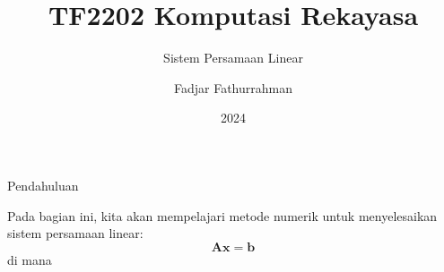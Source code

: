 

\title{TF2202 Komputasi Rekayasa}
\subtitle{Sistem Persamaan Linear}
\author{Fadjar Fathurrahman}
\date{2024}



\frame{\titlepage}

\begin{frame}{Pendahuluan}

Pada bagian ini, kita akan mempelajari metode numerik
untuk menyelesaikan sistem persamaan linear:
$$
\mathbf{A}\mathbf{x} = \mathbf{b}
$$
di mana $$

\end{frame}





